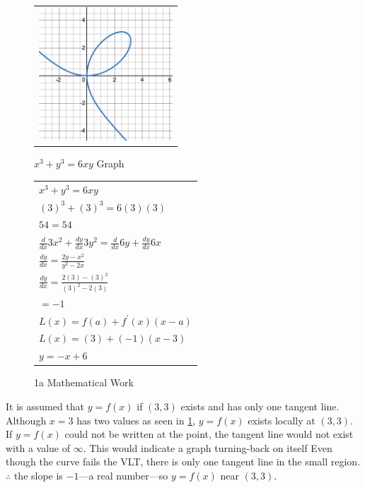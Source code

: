 \documentclass[answers,addpoints]{exam}
\begin{document}
\begin{questions}
  \question \
  \begin{solution}

    \begin{figure}[H]
      \centering
      \begin{tabular}{@{}l@{}}
        \includegraphics[width=5cm]{desmos-graph.png}
      \end{tabular}
      \caption{$x^3+y^3=6xy$ Graph}
      \label{fig:graph}
    \end{figure}

    \begin{figure}[H]
      \centering
      \begin{tabular}{@{}l@{}}
        $\displaystyle x^3+y^3=6xy$ \\[6pt]
        $\displaystyle (3)^3+(3)^3=6(3)(3)$ \\[6pt]
        $\displaystyle 54=54$ \\[12pt]
        $\displaystyle \frac{d}{dx}3x^2+\frac{dy}{dx}3y^2=\frac{d}{dx}6y+\frac{dy}{dx}6x$ \\[6pt]
        $\displaystyle \frac{dy}{dx}=\frac{2y-x^2}{y^2-2x}$ \\[6pt]
        $\displaystyle \frac{dy}{dx}=\frac{2(3)-(3)^2}{(3)^2-2(3)}$ \\[6pt]
        $\displaystyle =-1$ \\[12pt]
        $\displaystyle L(x)=f(a)+f^\prime(x)(x-a)$ \\[6pt]
        $\displaystyle L(x)=(3)+(-1)(x-3)$ \\[6pt]
        $\displaystyle y=-x+6$ \\
      \end{tabular}
      \caption{1a Mathematical Work}
      \label{fig:1a-math}
    \end{figure}

    It is assumed that $y=f(x)$ if $(3,3)$ exists and has only one tangent line. Although $x=3$ has two values as seen in \ref{fig:graph}, $y=f(x)$ exists locally at $(3,3)$. If $y=f(x)$ could not be written at the point, the tangent line would not exist with a value of $\infty$. This would indicate a graph turning-back on itself Even though the curve fails the VLT, there is only one tangent line in the small region. $\therefore$ the slope is $-1$—a real number—so $y=f(x)$ near $(3,3)$.


\end{solution}
\end{questions}
\end{document}
